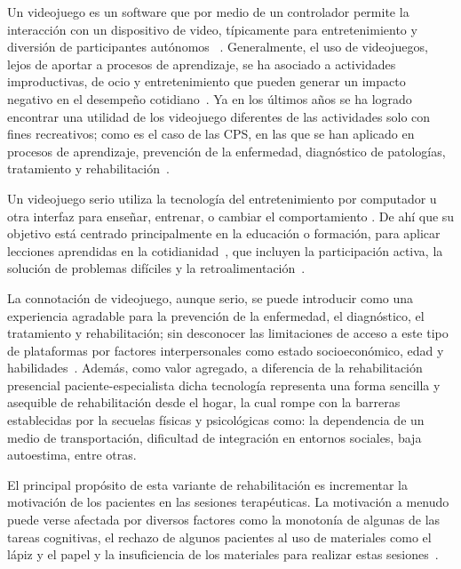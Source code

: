 \begin{introduction}
    \vspace{5pt}
    Un videojuego es un software que por medio de un controlador permite la interacción con un dispositivo
    de video, típicamente para entretenimiento y diversión de participantes autónomos ~\cite{studenski2010interactive, gomez2012videojuegos, gonzalez2016mooc}. 
    Generalmente, el uso de videojuegos, 
    lejos de aportar a procesos de aprendizaje, se ha asociado a actividades improductivas, de ocio y entretenimiento que pueden 
    generar un impacto negativo en el desempeño cotidiano~\cite{maldonado2014videojuegos}. Ya en los últimos años se ha logrado encontrar una 
    utilidad de los videojuego diferentes de las actividades solo con fines recreativos; como es el caso de las CPS, en las 
    que se han aplicado en procesos de aprendizaje, prevención de la enfermedad, diagnóstico de patologías, 
    tratamiento y rehabilitación~\cite{ladino2021uso}. 

    \vspace{5pt}
    Un videojuego serio utiliza la tecnología del entretenimiento por computador u otra interfaz para enseñar, entrenar, o cambiar el comportamiento . De ahí que su objetivo está centrado principalmente en la educación o formación, para aplicar lecciones aprendidas en la cotidianidad~\cite{graafland2014serious}, que incluyen la participación activa, la solución de problemas
    difíciles y la retroalimentación~\cite{gee2004learning}.
    
    \vspace{5pt}
    La connotación de videojuego, aunque serio, se puede introducir como una experiencia agradable para la prevención de la enfermedad, el diagnóstico, el tratamiento y rehabilitación; sin desconocer las limitaciones de acceso a este tipo de plataformas por factores interpersonales como estado socioeconómico, edad y habilidades~\cite{ladino2021uso}. Además, como valor agregado, a diferencia de la rehabilitación presencial paciente-especialista dicha tecnología representa una forma sencilla y asequible de rehabilitación desde el hogar, la cual rompe con la barreras establecidas por la secuelas físicas y psicológicas como: la dependencia de un medio de transportación, dificultad de integración en entornos sociales, baja autoestima, entre otras.

    \vspace{5pt}
    El principal propósito de esta variante de rehabilitación es incrementar la 
    motivación de los pacientes en las sesiones terapéuticas. La motivación a menudo puede verse afectada 
    por diversos factores como la monotonía de algunas de las tareas cognitivas, el rechazo de algunos 
    pacientes al uso de materiales como el lápiz y el papel y la insuficiencia de los materiales para 
    realizar estas sesiones~\cite{regalon12019juegos}. 


\end{introduction}
